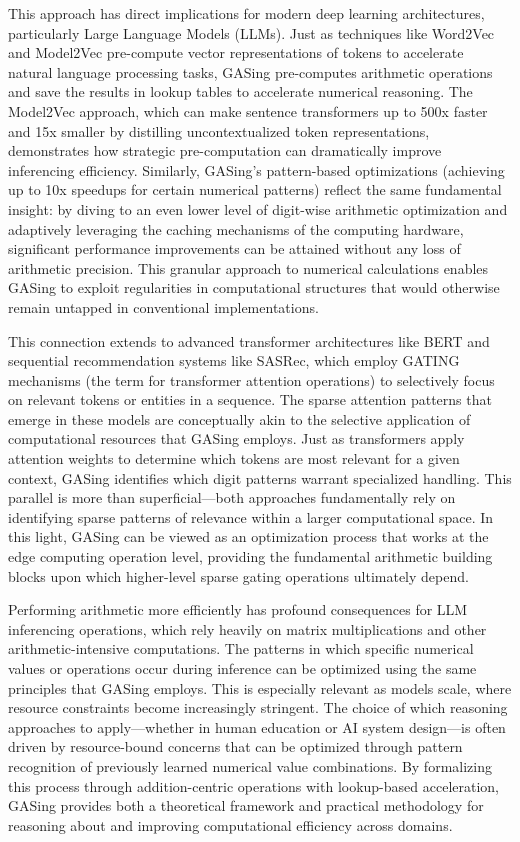 This approach has direct implications for modern deep learning architectures, particularly Large Language Models (LLMs). Just as techniques like Word2Vec and Model2Vec pre-compute vector representations of tokens to accelerate natural language processing tasks, GASing pre-computes arithmetic operations and save the results in lookup tables to accelerate numerical reasoning. The Model2Vec approach, which can make sentence transformers up to 500x faster and 15x smaller by distilling uncontextualized token representations, demonstrates how strategic pre-computation can dramatically improve inferencing efficiency. Similarly, GASing's pattern-based optimizations (achieving up to 10x speedups for certain numerical patterns) reflect the same fundamental insight: by diving to an even lower level of digit-wise arithmetic optimization and adaptively leveraging the caching mechanisms of the computing hardware, significant performance improvements can be attained without any loss of arithmetic precision. This granular approach to numerical calculations enables GASing to exploit regularities in computational structures that would otherwise remain untapped in conventional implementations.

This connection extends to advanced transformer architectures like BERT and sequential recommendation systems like SASRec, which employ GATING mechanisms (the term for transformer attention operations) to selectively focus on relevant tokens or entities in a sequence. The sparse attention patterns that emerge in these models are conceptually akin to the selective application of computational resources that GASing employs. Just as transformers apply attention weights to determine which tokens are most relevant for a given context, GASing identifies which digit patterns warrant specialized handling. This parallel is more than superficial—both approaches fundamentally rely on identifying sparse patterns of relevance within a larger computational space. In this light, GASing can be viewed as an optimization process that works at the edge computing operation level, providing the fundamental arithmetic building blocks upon which higher-level sparse gating operations ultimately depend.

Performing arithmetic more efficiently has profound consequences for LLM inferencing operations, which rely heavily on matrix multiplications and other arithmetic-intensive computations. The patterns in which specific numerical values or operations occur during inference can be optimized using the same principles that GASing employs. This is especially relevant as models scale, where resource constraints become increasingly stringent. The choice of which reasoning approaches to apply—whether in human education or AI system design—is often driven by resource-bound concerns that can be optimized through pattern recognition of previously learned numerical value combinations. By formalizing this process through addition-centric operations with lookup-based acceleration, GASing provides both a theoretical framework and practical methodology for reasoning about and improving computational efficiency across domains.
